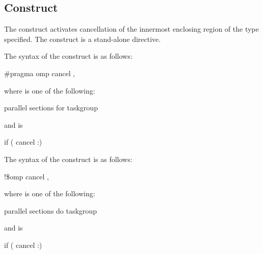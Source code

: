 {{{{\subsection{ Construct}
\label{subsec:cancel Construct}
\summary
The  construct activates cancellation of the innermost enclosing region of the 
type specified. The  construct is a stand-alone directive.

\syntax
\ccppspecificstart
The syntax of the  construct is as follows:

\begin{boxedcode}
\#pragma omp cancel \plc{construct-type-clause [ [},\plc{] if-clause] new-line}
\end{boxedcode}

\begin{samepage}
where  is one of the following:

\begin{indentedcodelist}
parallel
sections
for
taskgroup
\end{indentedcodelist}
\end{samepage}

and  is
\begin{indentedcodelist}
if (\plc{[} cancel :\plc{] scalar-expression})
\end{indentedcodelist}
\ccppspecificend

\fortranspecificstart
The syntax of the  construct is as follows:

\begin{boxedcode}
!\$omp cancel \plc{construct-type-clause [ [},\plc{] if-clause]}
\end{boxedcode}

\begin{samepage}
where  is one of the following:
\begin{indentedcodelist}
parallel
sections
do
taskgroup
\end{indentedcodelist}
\end{samepage}

and  is

\begin{indentedcodelist}
if (\plc{[} cancel :\plc{] scalar-logical-expression})
\end{indentedcodelist}
\fortranspecificend

}}}}
